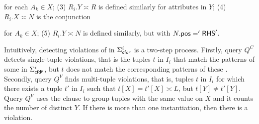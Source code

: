 \noindent for each $A_{k} \in X$; (3) $R_i.Y\asymp R$ is defined similarly for attributes in $Y$; (4) $R_i.X\asymp N$ is the conjunction

\begin{footnotesize}
\end{footnotesize}

\noindent for $A_{k} \in X$; (5) $R_i.Y\asymp N$ is defined similarly, but with $N.\protect\mathsf{pos}='{\mathsf{RHS}}'$.

Intuitively, detecting violations of \pCFDs in $\Sigma_{{\mathsf{cfd^p}}}^i$ is a two-step process. Firstly, query $Q^{C}$ detects single-tuple violations, that is the tuples $t$ in $I_{i}$ that match the \LHS patterns of some \pCFDs in $\Sigma_{{\mathsf{cfd^p}}}^i$, but $t$ does not match the corresponding \RHS patterns of these \pCFDs. Secondly, query $Q^{V}$ finds multi-tuple violations, that is, tuples $t$ in $I_{i}$ for which there exists a tuple $t'$ in $I_{i}$ such that $t[X]=t'[X] \asymp L$, but $t[Y] \neq t'[Y]$. Query $Q^{V}$ uses the  clause to group tuples with the same value on $X$ and it counts the number of distinct $Y$. If there is more than one instantiation, then there is a violation.

